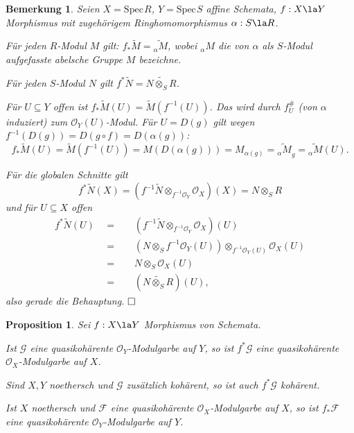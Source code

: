\documentclass[11pt]{book}
\newtheorem{proposition}[theorem]{Proposition}
\newtheorem{remark}[theorem]{Bemerkung}
\theoremstyle{nonumberbreak}
\newenvironment{pr}[1][]{\ifthenelse{\equal{#1}{}}{\proof}{\proof[#1]}\rm}{\endproof}
\newcommand{\spec}{\mathrm{Spec} \hspace{1pt} }
\begin{document}
\begin{spacing}{1.4}
\begin{remark}   %
Seien $X= \spec R$, $Y= \spec S$ affine Schemata, $f: X \la Y$ Morphismus mit zugehörigem Ringhomomorphismus $\alpha: S \la R$.
\begin{compactenum}
\item Für jeden $R$-Modul $M$ gilt: $f_* \tilde{M} = \widetilde{_{\alpha}M}$, wobei $_{\alpha}M$ die von $\alpha$ als $S$-Modul aufgefasste abelsche Gruppe $M$ bezeichne.
\item Für jeden $S$-Modul $N$ gilt $f^* \tilde{N} = \widetilde{N \otimes_S R}$.
\end{compactenum}
\begin{pr}
\begin{compactenum}
\item Für $U \subseteq Y$ offen ist $f_*\tilde{M}(U) = \tilde{M}(f^{-1}(U))$. Das wird durch $f_U^\#$ (von $\alpha$ induziert) zum $\mathcal{O}_Y(U)$-Modul. Für $U=D(g)$ gilt wegen $f^{-1}(D(g)) = D(g \circ f) = D(\alpha(g))$:
$$f_*\tilde{M}(U)=\tilde{M}(f^{-1}(U)) = M\left(D(\alpha(g))\right) = M_{\alpha(g)}= \widetilde{_{\alpha}M}_g = \widetilde{_{\alpha}M}(U).$$
\item Für die globalen Schnitte gilt
$$f^* \tilde{N}(X) = \left( f^{-1} \tilde{N} \otimes_{f^{-1}\mathcal{O}_Y} \mathcal{O}_X\right)(X) = N \otimes_S R$$
und für $U \subseteq X$ offen
\setlength{\abovedisplayskip}{5.5pt}
\setlength{\belowdisplayskip}{5.5pt}
\begin{alignat*}{5}
f^*\tilde{N}(U) \ \ &=&& \ \ \left(f^{-1}\tilde{N} \otimes_{f^{-1}\mathcal{O}_Y} \mathcal{O}_X\right)(U) \\
&=&& \ \ \left( N \otimes_S f^{-1}\mathcal{O}_Y(U) \right) \otimes_{f^{-1}\mathcal{O}_Y(U)} \mathcal{O}_X(U) \\
&=&& \ \ N \otimes_S \mathcal{O}_X(U)\\
&=&& \ \ \left(\widetilde{N \otimes_S R} \right) (U),
\end{alignat*}
also gerade die Behauptung. $\hfill \Box$

\end{compactenum}
\end{pr}
\end{remark}



\begin{proposition} %



Sei $f: X \la Y$ Morphismus von Schemata.
\begin{compactenum}
\item Ist $\mathcal{G}$ eine quasikohärente $\mathcal{O}_Y$-Modulgarbe auf $Y$, so ist $f^{*} \mathcal{G}$ eine quasikohärente $\mathcal{O}_X$-Modulgarbe auf $X$.
\item Sind $X,Y$ noethersch und $\mathcal{G}$ zusätzlich kohärent, so ist auch $f^*\mathcal{G}$ kohärent.
\item Ist $X$ noethersch und $\mathcal{F}$ eine quasikohärente $\mathcal{O}_X$-Modulgarbe auf $X$, so ist $f_* \mathcal{F}$ eine quasikohärente $\mathcal{O}_Y$-Modulgarbe auf $Y$.
\end{compactenum}


\end{proposition}
\end{spacing}
\end{document}
